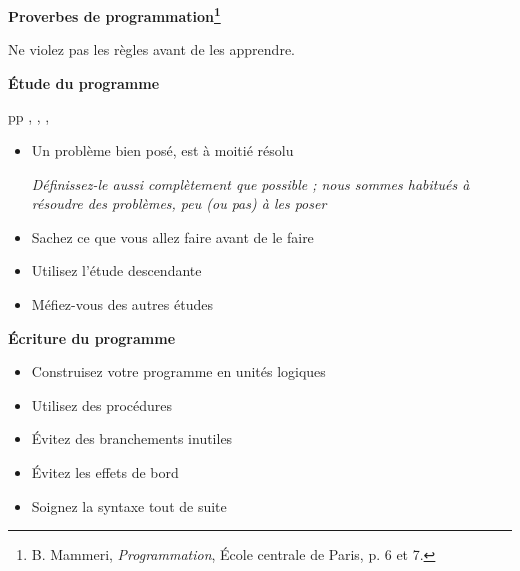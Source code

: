 \centerline{\Large \bf Proverbes de programmation\footnote{ 
B. Mammeri, {\em Programmation}, \'Ecole centrale de Paris, p. 6 et 7.} }
\label{Proverbe}

\noindent\hrulefill
{\small 
\begin{multicols}{2}

Ne violez pas les r\`egles
avant de les apprendre.


\begin{description}
\item {\normalsize  {\bf \'Etude du programme}}

      pp \pageref{Methode}, \pageref{Repetition},
      \pageref{Composition}, \pageref{Kmag}

\begin{itemize}

\item Un probl\`eme bien pos\'e, est \`a moiti\'e r\'esolu

      {\em D\'efinissez-le aussi compl\`etement que possible ;
	   nous sommes habitu\'es \`a r\'esoudre des probl\`emes, peu (ou pas) 
	   \`a les poser}


\item Sachez ce que vous allez faire avant de le faire

\item Utilisez l'\'etude descendante

\item M\'efiez-vous des autres \'etudes

\end{itemize}

\item {\normalsize  {\bf \'Ecriture du programme}}

\begin{itemize}

\item Construisez votre programme
en unit\'es logiques

\item Utilisez des proc\'edures

\item \'Evitez des branchements inutiles

\item \'Evitez les effets de bord

\item Soignez la syntaxe tout de suite


\end{itemize}
\end{description}
\end{multicols}}

